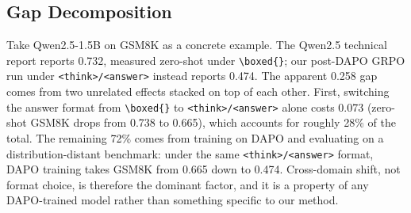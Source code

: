 \documentclass{article} %
\theoremstyle{definition}
\theoremstyle{remark}
\begin{document}
\subsection{Gap Decomposition}

Take Qwen2.5-1.5B on GSM8K as a concrete example. The Qwen2.5 technical report reports 0.732, measured zero-shot under \texttt{\textbackslash boxed\{\}}; our post-DAPO GRPO run under \texttt{<think>/<answer>} instead reports 0.474. The apparent 0.258 gap comes from two unrelated effects stacked on top of each other. First, switching the answer format from \texttt{\textbackslash boxed\{\}} to \texttt{<think>/<answer>} alone costs 0.073 (zero-shot GSM8K drops from 0.738 to 0.665), which accounts for roughly 28\% of the total. The remaining 72\% comes from training on DAPO and evaluating on a distribution-distant benchmark: under the same \texttt{<think>/<answer>} format, DAPO training takes GSM8K from 0.665 down to 0.474. Cross-domain shift, not format choice, is therefore the dominant factor, and it is a property of any DAPO-trained model rather than something specific to our method.


\end{document}
